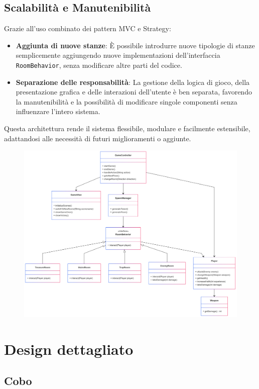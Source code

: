 \documentclass[a4paper,12pt]{report}
\begin{document}
\subsection*{Scalabilità e Manutenibilità}
Grazie all'uso combinato dei pattern MVC e Strategy:
\begin{itemize}
    \item \textbf{Aggiunta di nuove stanze}: È possibile introdurre nuove tipologie di stanze semplicemente aggiungendo nuove implementazioni dell'interfaccia \texttt{RoomBehavior}, senza modificare altre parti del codice.
    \item \textbf{Separazione delle responsabilità}: La gestione della logica di gioco, della presentazione grafica e delle interazioni dell'utente è ben separata, favorendo la manutenibilità e la possibilità di modificare singole componenti senza influenzare l'intero sistema.
\end{itemize}

Questa architettura rende il sistema flessibile, modulare e facilmente estensibile, adattandosi alle necessità di futuri miglioramenti o aggiunte.
%
\begin{figure}[H]
	\includegraphics[scale=0.12]{img/design.png}
\end{figure}

\section{Design dettagliato}
\subsection{Cobo}
\end{document}
